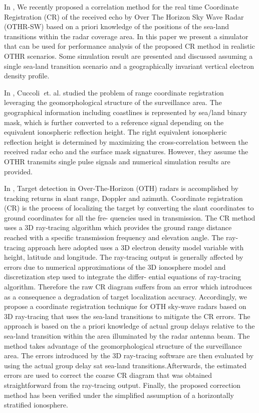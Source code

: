In \cite{cuccoli2010sea},
We recently proposed a correlation method for the real
time Coordinate Registration (CR) of the received echo by Over
The Horizon Sky Wave Radar (OTHR-SW) based on a priori
knowledge of the positions of the sea-land transitions within the
radar coverage area. In this paper we present a simulator that
can be used for performance analysis of the proposed CR method
in realistic OTHR scenarios. Some simulation result are
presented and discussed assuming a single sea-land transition
scenario and a geographically invariant vertical electron density
profile.

In \cite{cuccoli2011coordinate}, Cuccoli~{\emph et. al.} studied the problem of range coordinate registration
leveraging the geomorphological structure of the surveillance area.
The geographical information including coastlines is represented by sea/land binary mask, which is further converted to
a reference signal depending on the equivalent ionospheric reflection height.
The right equivalent ionospheric reflection height is determined by maximizing the cross-correlation between the received
radar echo and the surface mask signatures.
However, they assume the OTHR transmits single pulse signals and numerical simulation results are provided.

In \cite{cacciamano2012coordinate},
Target detection in Over-The-Horizon (OTH) radars is accomplished by tracking
returns in slant range, Doppler and azimuth. Coordinate registration (CR) is the process of
localizing the target by converting the slant coordinates to ground coordinates for all the fre-
quencies used in transmission. The CR method uses a 3D ray-tracing algorithm which provides
the ground range distance reached with a specific transmission frequency and elevation angle.
The ray-tracing approach here adopted uses a 3D electron density model variable with height,
latitude and longitude. The ray-tracing output is generally affected by errors due to numerical
approximations of the 3D ionosphere model and discretization step used to integrate the differ-
ential equations of ray-tracing algorithm. Therefore the raw CR diagram suffers from an error
which introduces as a consequence a degradation of target localization accuracy. Accordingly, we
propose a coordinate registration technique for OTH sky-wave radars based on 3D ray-tracing
that uses the sea-land transitions to mitigate the CR errors. The approach is based on the a priori
knowledge of actual group delays relative to the sea-land transition within the area illuminated
by the radar antenna beam. The method takes advantage of the geomorphological structure of
the surveillance area. The errors introduced by the 3D ray-tracing software are then evaluated by
using the actual group delay sat sea-land transitions.Afterwards, the estimated errors are used to
correct the coarse CR diagram that was obtained straightforward from the ray-tracing output.
Finally, the proposed correction method has been verified under the simplified assumption of a
horizontally stratified ionosphere.


